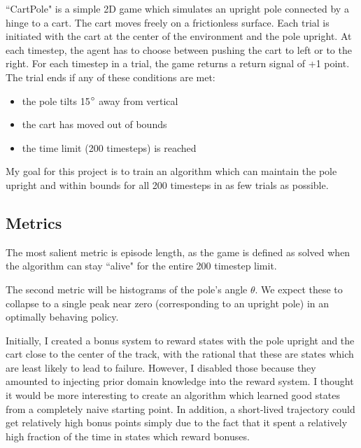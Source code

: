 \documentclass[12pt,a4paper]{article}
\begin{document}
``CartPole" is a simple 2D game which simulates an upright pole connected by a hinge to a cart.\cite{cartpole} The cart moves freely on a frictionless surface. Each trial is initiated with the cart at the center of the environment and the pole upright. At each timestep, the agent has to choose between pushing the cart to left or to the right.  For each timestep in a trial, the game returns a return signal of +1 point. The trial ends if any of these conditions are met:

\begin{itemize}
 \item  the pole tilts 15$\degree$ away from vertical
 \item the cart has moved out of bounds
 \item the time limit (200 timesteps) is reached
 \end{itemize}
 
My goal for this project is to train an algorithm which can maintain the pole upright and within bounds for all 200 timesteps in as few trials as possible.

\subsection*{Metrics}

The most salient metric is episode length, as the game is defined as solved when the algorithm can stay ``alive" for the entire 200 timestep limit.

The second metric will be histograms of the pole's angle $\theta$. We expect these to collapse to a single peak near zero (corresponding to an upright pole) in an optimally behaving policy.

Initially, I created a bonus system to reward states with the pole upright and the cart close to the center of the track, with the rational that these are states which are least likely to lead to failure. However, I disabled those because they amounted to injecting prior domain knowledge into the reward system. I thought it would be more interesting to create an algorithm which learned good states from a completely naive starting point. In addition, a short-lived trajectory could get relatively high bonus points simply due to the fact that it spent a relatively high fraction of the time in states which reward bonuses.
\end{document}
